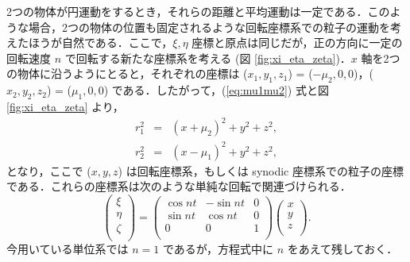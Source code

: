 \documentclass[11pt,a4paper,oneside,onecolumn]{jarticle}
\begin{document}
2つの物体が円運動をするとき，それらの距離と平均運動は一定である．このような場合，2つの物体の位置も固定されるような回転座標系での粒子の運動を考えたほうが自然である．ここで，$\xi, \eta$ 座標と原点は同じだが，正の方向に一定の回転速度 $n$ で回転する新たな座標系を考える (図 \ref{fig:xi_eta_zeta})．$x$ 軸を2つの物体に沿うようにとると，それぞれの座標は ($x_1, y_1,z_1$) = ($- \mu_2, 0, 0$)，($x_2, y_2, z_2$) = ($\mu_1, 0, 0$) である．したがって，(\ref{eq:mu1mu2}) 式と図 \ref{fig:xi_eta_zeta} より，
\begin{eqnarray}
r_1^2 & = & (x + \mu_2)^2 + y^2 + z^2,\\
r_2^2 & = & (x - \mu_1)^2 + y^2 + z^2,
\end{eqnarray}
となり，ここで ($x, y, z$) は回転座標系，もしくは synodic 座標系での粒子の座標である．これらの座標系は次のような単純な回転で関連づけられる．
\begin{equation}
\begin{pmatrix}
\xi\\
\eta\\
\zeta\\
\end{pmatrix}
= 
\begin{pmatrix}
\cos nt & - \sin nt & 0\\
\sin nt & \cos nt & 0\\
0 & 0 & 1\\
\end{pmatrix}
\begin{pmatrix}
x\\
y\\
z\\
\end{pmatrix}. \label{eq:xi_eta_zeta_x_y_z}
\end{equation}
今用いている単位系では $n = 1$ であるが，方程式中に $n$ をあえて残しておく．
\end{document}
